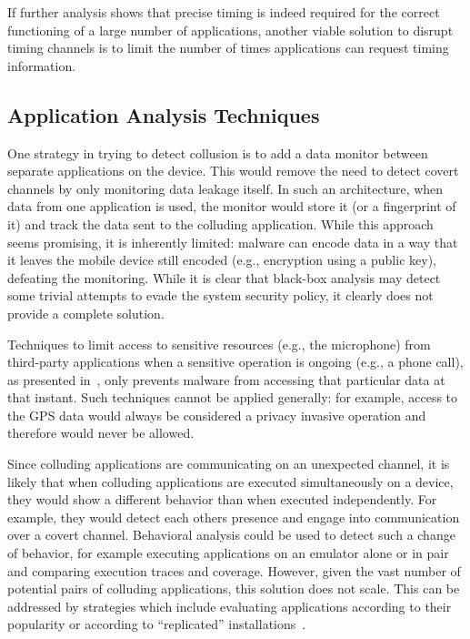 If further analysis shows that precise timing is indeed required for
the correct functioning of a large number of applications, another
viable solution to disrupt timing channels is to limit the number of
times applications can request timing information.

\subsection{Application Analysis Techniques}

 One strategy in trying to detect
collusion is to add a data monitor between separate applications on
the device. This would remove the need to detect covert channels by
only monitoring data leakage itself. In such an architecture, when
data from one application is used, the monitor would store it (or a
fingerprint of it) and track the data sent to the colluding
application. While this approach seems promising, it is inherently
limited: malware can encode data in a way that it leaves the mobile
device still encoded (e.g., encryption using a public key), defeating
the monitoring. While it is clear that black-box analysis may detect
some trivial attempts to evade the system security policy, it clearly
does not provide a complete solution.

 Techniques to
limit access to sensitive resources (e.g., the microphone) from
third-party applications when a sensitive operation is ongoing (e.g.,
a phone call), as presented in~\cite{soundcomber-ndss}, only prevents
malware from accessing that particular data at that instant. Such
techniques cannot be applied generally: for example, access to the GPS
data would always be considered a privacy invasive operation and
therefore would never be allowed.

 Since colluding
applications are communicating on an unexpected channel, it is likely
that when colluding applications are executed simultaneously on a
device, they would show a different behavior than when executed
independently. For example, they would detect each others presence and
engage into communication over a covert channel. Behavioral analysis
could be used to detect such a change of behavior, for example
executing applications on an emulator alone or in pair and comparing
execution traces and coverage. However, given the vast number of
potential pairs of colluding applications, this solution does not
scale. This can be addressed by strategies which include evaluating
applications according to their popularity or according to
``replicated'' installations~\cite{paranoid:acsac10}.

